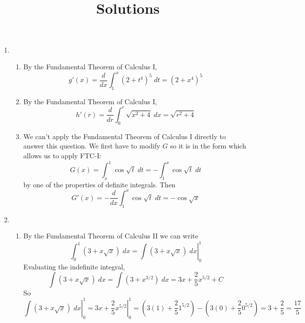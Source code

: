 \documentclass{article}
\title{\commonPSTitleZeroFourThree\ Solutions}
\author{\commonAuthor}
\date{\commonDateZeroFourThree}
\begin{document}
\maketitle
\begin{enumerate}
\item
  \begin{enumerate}
  \item By the Fundamental Theorem of Calculus I,
    \begin{equation*}
      g'(x) = \frac{d}{dx} \int_1^x (2+t^4)^5 \; dt
      = (2+x^4)^5
    \end{equation*}
  \item By the Fundamental Theorem of Calculus I,
    \begin{equation*}
      h'(r) = \frac{d}{dr} \int_0^r \sqrt{x^2+4} \; dx
      = \sqrt{r^2+4}
    \end{equation*}
  \item We can't apply the Fundamental Theorem of Calculus I directly
    to answer this question.  We first have to modify $G$ so it is in
    the form which allows us to apply FTC-I:
    \begin{equation*}
      G(x) = \int_x^1 \cos\sqrt{t}\; dt
      = -\int_1^x \cos\sqrt{t}\; dt
    \end{equation*}
    by one of the properties of definite integrals.  Then
    \begin{equation*}
      G'(x) = -\frac{d}{dx}\int_1^x \cos\sqrt{t} \; dt
      = -\cos\sqrt{x}
    \end{equation*}
  \end{enumerate}
\item
  \begin{enumerate}
  \item By the Fundamental Theorem of Calculus II we can write
    \begin{equation*}
      \int_0^1 (3+x\sqrt{x}) \; dx
      = \left. \int (3+x\sqrt{x}) \; dx \right|_0^1
    \end{equation*}
    Evaluating the indefinite integral,
    \begin{equation*}
      \int (3+x\sqrt{x}) \; dx
      = \int (3 + x^{3/2} ) \; dx
      = 3x + \frac{2}{5} x^{5/2} + C
    \end{equation*}
    So
    \begin{equation*}
      \left. \int (3+x\sqrt{x}) \; dx \right|_0^1
      = \left. 3x + \frac{2}{5} x^{5/2} \right|_0^1
      = \left( 3(1) + \frac{2}{5} 1^{5/2} \right)
      - \left( 3(0) + \frac{2}{5} 0^{5/2} \right)
      = 3 + \frac{2}{5} = \frac{17}{5}

\end{equation*}
\end{enumerate}
\end{enumerate}
\end{document}

